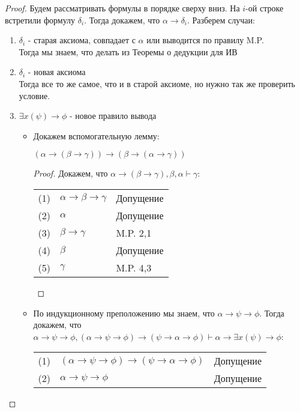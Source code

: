 \begin{proof}
Будем рассматривать формулы в порядке сверху вниз. На $i$-ой строке встретили формулу $\delta_{i}$. Тогда докажем, что $\alpha \rightarrow \delta_{i}$. Разберем случаи:
\begin{enumerate}
\item $\delta_{i}$ - старая аксиома, совпадает с $\alpha$ или выводится по правилу M.P.\\
Тогда мы знаем, что делать из Теоремы о дедукции для ИВ
\item $\delta_{i}$ - новая аксиома\\
Тогда все то же самое, что и в старой аксиоме, но нужно так же проверить условие.
\item $\exists x (\psi) \rightarrow \phi$ - новое правило вывода
\begin{itemize}
\item Докажем вспомогательную лемму:\\
\begin{lemma}
$(\alpha \rightarrow (\beta \rightarrow \gamma)) \rightarrow (\beta \rightarrow (\alpha \rightarrow \gamma))$
\end{lemma}
\begin{proof}
Докажем, что $\alpha \rightarrow (\beta \rightarrow \gamma), \beta, \alpha \vdash \gamma$:\\
\begin{tabular}{lll}
(1) & $\alpha \rightarrow \beta \rightarrow \gamma$& Допущение\\
(2) & $\alpha$& Допущение\\
(3) & $\beta \rightarrow \gamma$& M.P. 2,1\\
(4) & $\beta$& Допущение\\
(5) & $\gamma$& M.P. 4,3\\
\end{tabular}
\end{proof}
\item По индукционному преположению мы знаем, что $\alpha \rightarrow \psi \rightarrow \phi$. Тогда докажем, что $\alpha \rightarrow \psi \rightarrow \phi, (\alpha \rightarrow \psi \rightarrow \phi) \rightarrow (\psi \rightarrow \alpha \rightarrow \phi) \vdash \alpha \rightarrow \exists x (\psi) \rightarrow \phi$:\\
\begin{tabular}{lll}
(1) & $(\alpha \rightarrow \psi \rightarrow \phi) \rightarrow (\psi \rightarrow \alpha \rightarrow \phi)$& Допущение\\
(2) & $\alpha \rightarrow \psi \rightarrow \phi$& Допущение\\

\end{tabular}
\end{itemize}
\end{enumerate}
\end{proof}
